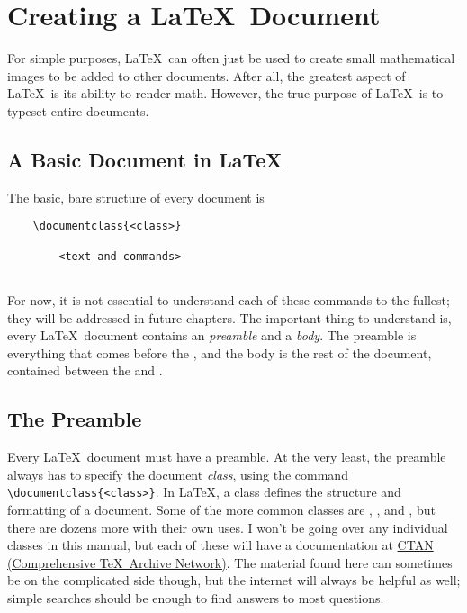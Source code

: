 \chapter{Creating a \LaTeX\ Document}
For simple purposes, \LaTeX\ can often just be used to create small mathematical images to be added to other documents. After all, the greatest aspect of \LaTeX\ is its ability to render math. However, the true purpose of \LaTeX\ is to typeset entire documents.

\section{A Basic Document in \LaTeX}
The basic, bare structure of every document is 
\begin{lstlisting}
	\documentclass{<class>}
	
		<text and commands>
	
\end{lstlisting}
For now, it is not essential to understand each of these commands to the fullest; they will be addressed in future chapters. The important thing to understand is, every \LaTeX\ document contains an \emph{preamble} and a \emph{body}. The preamble is everything that comes before the \verb||, and the body is the rest of the document, contained between the \verb|| and \verb||.

\section{The Preamble}
Every \LaTeX\ document must have a preamble. At the very least, the preamble always has to specify the document \emph{class}, using the command \verb|\documentclass{<class>}|. In \LaTeX, a class defines the structure and formatting of a document. Some of the more common classes are , , and , but there are dozens more with their own uses. I won't be going over any individual classes in this manual, but each of these will have a documentation at \href{https://ctan.org/}{CTAN (Comprehensive \TeX\ Archive Network)}. The material found here can sometimes be on the complicated side though, but the internet will always be helpful as well; simple searches should be enough to find answers to most questions. 

